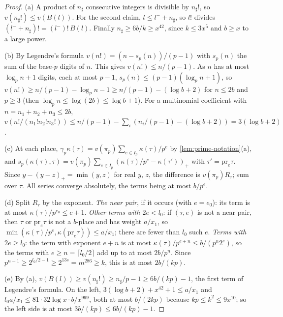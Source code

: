 \begin{proof}
(a) A product of $n_\sharp$ consecutive integers is divisible by $n_\sharp!$, so $v(n_\sharp!)\le v(B(l))$. For the second claim, $l\le l^-+n_\sharp$, so $l!$ divides $(l^-+n_\sharp)!=(l^-)!\,B(l)$. Finally $n_\sharp\ge6b/k\ge x^{42}$, since $k\le3x^5$ and $b\ge x$ to a large power.

(b) By Legendre's formula $v(n!)=(n-s_p(n))/(p-1)$ with $s_p(n)$ the sum of the base-$p$ digits of $n$. This gives $v(n!)\le n/(p-1)$. As $n$ has at most $\log_pn+1$ digits, each at most $p-1$, $s_p(n)\le(p-1)(\log_pn+1)$, so $v(n!)\ge n/(p-1)-\log_pn-1\ge n/(p-1)-(\log b+2)$ for $n\le2b$ and $p\ge3$ (then $\log_pn\le\log(2b)\le\log b+1$). For a multinomial coefficient with $n=n_1+n_2+n_3\le2b$, $v(n!/(n_1!n_2!n_3!))\le n/(p-1)-\sum_i(n_i/(p-1)-(\log b+2))=3(\log b+2)$.

(c) At each place, $\gamma_p\kappa(\tau)=v(\pi_p)\sum_{e\in I_p}\kappa(\tau)/p^e$ by \cref{lem:prime-notation}(a), and $s_p(\kappa(\tau),\tau)=v(\pi_p)\sum_{e\in I_p}(\kappa(\tau)/p^e-\kappa(\tau'))_+$ with $\tau'=\mathrm{pr}_e\tau$. Since $y-(y-z)_+=\min(y,z)$ for real $y$, $z$, the difference is $v(\pi_p)R_\tau$; sum over $\tau$. All series converge absolutely, the terms being at most $b/p^e$.

(d) Split $R_\tau$ by the exponent. \emph{The near pair}, if it occurs (with $e=e_0$): its term is at most $\kappa(\tau)/p^{e_0}\le c+1$. \emph{Other terms with $2e<l_0$}: if $(\tau,e)$ is not a near pair, then $\tau$ or $\mathrm{pr}_e\tau$ is not a $b$-place and has weight $a/x_1$, so $\min(\kappa(\tau)/p^e,\kappa(\mathrm{pr}_e\tau))\le a/x_1$; there are fewer than $l_0$ such $e$. \emph{Terms with $2e\ge l_0$}: the term with exponent $e+n$ is at most $\kappa(\tau)/p^{e+n}\le b/(p^n2^e)$, so the terms with $e\ge n=\lceil l_0/2\rceil$ add up to at most $2b/p^n$. Since $p^{n-1}\ge2^{l_0/2-1}\ge2^{13s}=m^{286}\ge k$, this is at most $2b/(kp)$.

(e) By (a), $v(B(l))\ge v(n_\sharp!)\ge n_\sharp/p-1\ge6b/(kp)-1$, the first term of Legendre's formula. On the left, $3(\log b+2)+x^{42}+1\le a/x_1$ and $l_0a/x_1\le81\cdot32\log x\cdot b/x^{999}$, both at most $b/(2kp)$ because $kp\le k^2\le9x^{10}$; so the left side is at most $3b/(kp)\le6b/(kp)-1$.
\end{proof}


